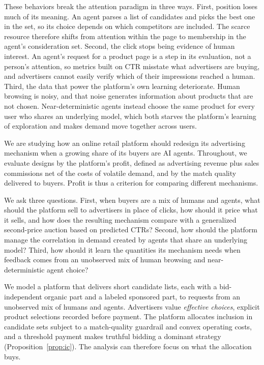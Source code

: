 \documentclass[opre,dblanonrev]{informs4}
\providecommand{\1}{\mathbf{1}}
\begin{document}
These behaviors break the attention paradigm in three ways. First, position loses much of its meaning. An agent parses a list of candidates and picks the best one in the set, so its choice depends on which competitors are included. The scarce resource therefore shifts from attention within the page to membership in the agent's consideration set. Second, the click stops being evidence of human interest. An agent's request for a product page is a step in its evaluation, not a person's attention, so metrics built on CTR misstate what advertisers are buying, and advertisers cannot easily verify which of their impressions reached a human. Third, the data that power the platform's own learning deteriorate. Human browsing is noisy, and that noise generates information about products that are not chosen. Near-deterministic agents instead choose the same product for every user who shares an underlying model, which both starves the platform's learning of exploration and makes demand move together across users.

We are studying how an online retail platform should redesign its advertising mechanism when a growing share of its buyers are AI agents. Throughout, we evaluate designs by the platform's profit, defined as advertising revenue plus sales commissions net of the costs of volatile demand, and by the match quality delivered to buyers. Profit is thus a criterion for comparing different mechanisms.

We ask three questions. First, when buyers are a mix of humans and agents, what should the platform sell to advertisers in place of clicks, how should it price what it sells, and how does the resulting mechanism compare with a generalized second-price auction based on predicted CTRs? Second, how should the platform manage the correlation in demand created by agents that share an underlying model? Third, how should it learn the quantities its mechanism needs when feedback comes from an unobserved mix of human browsing and near-deterministic agent choice?

We model a platform that delivers short candidate lists, each with a bid-independent organic part and a labeled sponsored part, to requests from an unobserved mix of humans and agents. Advertisers value \emph{effective choices}, explicit product selections recorded before payment. The platform allocates inclusion in candidate sets subject to a match-quality guardrail and convex operating costs, and a threshold payment makes truthful bidding a dominant strategy (Proposition~\ref{prop:ic}). The analysis can therefore focus on what the allocation buys.
\end{document}
